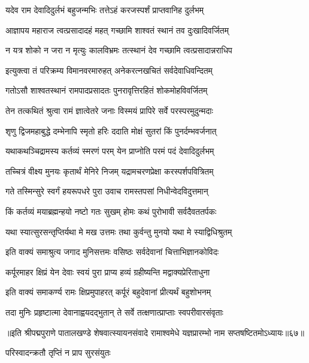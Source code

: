 \twolineshloka
{यदेव राम देवादिदुर्लभं बहुजन्मभिः}
{तत्तेऽहं करजस्पर्शं प्राप्तवानिह दुर्लभम्}%

\twolineshloka
{आज्ञापय महाराज त्वत्प्रसादादहं महत्}
{गच्छामि शाश्वतं स्थानं तव दुःखादिवर्जितम्}%

\twolineshloka
{न यत्र शोको न जरा न मृत्युः कालविभ्रमः}
{तत्स्थानं देव गच्छामि त्वत्प्रसादान्नराधिप}%

\twolineshloka
{इत्युक्त्वा तं परिक्रम्य विमानवरमारुहत्}
{अनेकरत्नखचितं सर्वदेवाधिवन्दितम्}%

\twolineshloka
{गतोऽसौ शाश्वतस्थानं रामपादप्रसादतः}
{पुनरावृत्तिरहितं शोकमोहविवर्जितम्}%

\twolineshloka
{तेन तत्कथितं श्रुत्वा रामं ज्ञात्वेतरे जनाः}
{विस्मयं प्रापिरे सर्वे परस्परमुदुन्मदाः}%

\twolineshloka
{शृणु द्विजमहाबुद्धे दम्भेनापि स्मृतो हरिः}
{ददाति मोक्षं सुतरां किं पुनर्दम्भवर्जनात्}%

\twolineshloka
{यथाकथञ्चिद्रामस्य कर्तव्यं स्मरणं परम्}
{येन प्राप्नोति परमं पदं देवादिदुर्लभम्}%

\twolineshloka
{तच्चित्रं वीक्ष्य मुनयः कृतार्थं मेनिरे निजम्}
{यद्रामचरणप्रेक्षा करस्पर्शपवित्रितम्}%

\twolineshloka
{गते तस्मिन्सुरे स्वर्गं हयरूपधरे पुरा}
{उवाच रामस्तपसां निधीन्वेदविदुत्तमान्}%

\twolineshloka
{किं कर्तव्यं मयाब्रह्मन्हयो नष्टो गतः सुखम्}
{होमः कथं पुरोभावी सर्वदैवततर्पकः}%

\twolineshloka
{यथा स्यात्सुरसन्तृप्तिर्यथा मे मख उत्तमः}
{तथा कुर्वन्तु मुनयो यथा मे स्याद्विधिश्रुतम्}%

\twolineshloka
{इति वाक्यं समाश्रुत्य जगाद मुनिसत्तमः}
{वसिष्ठः सर्वदेवानां चित्ताभिज्ञानकोविदः}%

\twolineshloka
{कर्पूरमाहर क्षिप्रं येन देवाः स्वयं पुरा}
{प्राप्य हव्यं ग्रहीष्यन्ति मद्वाक्यप्रेरिताधुना}%

\twolineshloka
{इति वाक्यं समाकर्ण्य रामः क्षिप्रमुपाहरत्}
{कर्पूरं बहुदेवानां प्रीत्यर्थं बहुशोभनम्}%

\twolineshloka
{तदा मुनिः प्रहृष्टात्मा देवानाह्वयदद्भुतान्}
{ते सर्वे तत्क्षणात्प्राप्ताः स्वपरीवारसंवृताः}%

{॥इति श्रीपद्मपुराणे पातालखण्डे शेषवात्स्यायनसंवादे रामाश्वमेधे यज्ञप्रारम्भो नाम सप्तषष्टितमोऽध्यायः॥६७॥}



\onelineshloka
{परिस्वादन्क्रतौ तृप्तिं न प्राप सुरसंयुतः}%

